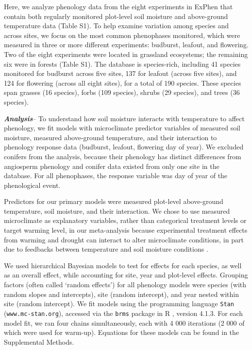 \documentclass{article}
\begin{document}
\par Here, we analyze phenology data from the eight experiments in ExPhen that contain both regularly monitored plot-level soil moisture and above-ground temperature data (Table S1). To help examine variation among species and across sites, we focus on the most common phenophases monitored, which were measured in three or more different experiments: budburst, leafout, and flowering. Two of the eight experiments were located in grassland ecosystems; the remaining six were in forests (Table S1). The database is species-rich, including 41 species monitored for budburst across five sites, 137 for leafout (across five sites), and 124 for flowering (across all eight sites), for a total of 190 species. These species span grasses (16 species), forbs (109 species), shrubs (29 species), and trees (36 species). 

\par\textbf {\emph{Analysis}}--
To understand how soil moisture interacts with temperature to affect phenology, we fit models with microclimate predictor variables of measured soil moisture, measured above-ground temperature, and their interaction to phenology response data (budburst, leafout, flowering day of year). We excluded conifers from the analysis, because their phenology has distinct differences from angiosperm phenology \cite{polgar2014} and conifer data existed from only one site in the database. For all phenophases, the response variable was day of year of the phenological event. 
\par Predictors for our primary models were measured plot-level above-ground temperature, soil moisture, and their interaction. We chose to use measured microclimate as explanatory variables, rather than categorical treatment levels or target warming level, in our meta-analysis because experimental treatment effects from warming and drought can interact to alter microclimate conditions, in part due to feedbacks between temperature and soil moisture conditions \citep{ettinger2019,mcdaniel2014}.
 
\par We used hierarchical Bayesian models to test for effects for each species, as well as an overall effect, while accounting for site, year and plot-level effects. Grouping factors (often called `random effects') for all phenology models were species (with random slopes and intercepts), site (random intercept), and year nested within site (random intercept). We fit models using the programming language \texttt{Stan} \citep{Carpenter:2016aa} (\texttt{www.mc-stan.org}), accessed via the \texttt{brms} \citep{burkner2021} package in R \citep{rcoreteam2022}, version 4.1.3. For each model fit, we ran four chains simultaneously, each with 4 000 iterations (2 000 of which were used for warm-up). Equations for these models can be found in the Supplemental Methods. 
\end{document}
